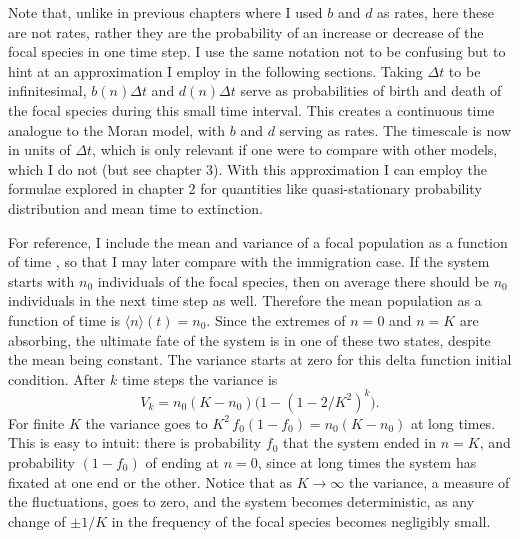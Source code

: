 Note that, unlike in previous chapters where I used $b$ and $d$ as rates, here these are not rates, rather they are the probability of an increase or decrease of the focal species in one time step. 
I use the same notation not to be confusing but to hint at an approximation I employ in the following sections. %
Taking $\Delta t$ to be infinitesimal, $b(n)\Delta t$ and $d(n)\Delta t$ serve as probabilities of birth and death of the focal species during this small time interval. 
This creates a continuous time analogue to the Moran model, with $b$ and $d$ serving as rates. 
The timescale is now in units of $\Delta t$, which is only relevant if one were to compare with other models, which I do not (but see chapter 3). 
With this approximation I can employ the formulae explored in chapter 2 for quantities like quasi-stationary probability distribution and mean time to extinction. 

For reference, I include the mean and variance of a focal population as a function of time \cite{Moran1962,Kimura1964,McKane2003}, so that I may later compare with the immigration case. 
If the system starts with $n_0$ individuals of the focal species, then on average there should be $n_0$ individuals in the next time step as well.
Therefore the mean population as a function of time is $\langle n\rangle(t) = n_0$. 
Since the extremes of $n=0$ and $n=K$ are absorbing, the ultimate fate of the system is in one of these two states, despite the mean being constant. 
The variance starts at zero for this delta function initial condition. 
After $k$ time steps the variance is
\begin{equation}
V_k = n_0(K-n_0) \big(1-(1-2/K^2)^k\big).
\end{equation}
For finite $K$ the variance goes to $K^2 \, f_0(1-f_0)=n_0(K-n_0)$ at long times. 
This is easy to intuit: there is probability $f_0$ that the system ended in $n=K$, and probability $(1-f_0)$ of ending at $n=0$, since at long times the system has fixated at one end or the other. 
Notice that as $K\rightarrow\infty$ the variance, a measure of the fluctuations, goes to zero, and the system becomes deterministic, as any change of $\pm 1/K$ in the frequency of the focal species becomes negligibly small. %

